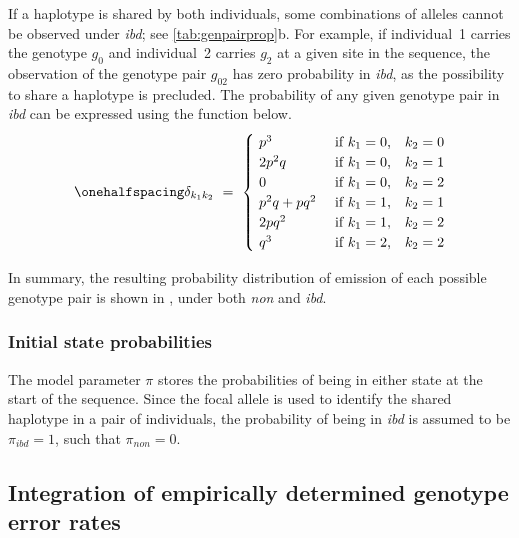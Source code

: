If a haplotype is shared by both individuals, some combinations of alleles cannot be observed under \emph{ibd}; see \cref{tab:genpairprop}{b}.
For example, if individual~1 carries the genotype $g_0$ and individual~2 carries $g_2$ at a given site in the sequence, the observation of the genotype pair $g_{02}$ has zero probability in \emph{ibd}, as the possibility to share a haplotype is precluded.
The probability of any given genotype pair in \emph{ibd} can be expressed using the function below.
\begin{equation}\label{eq:genpairibd}\onehalfspacing
	\delta_{k_1 k_2} ~=~
  \begin{cases}
		~ p^3           & ~ \text{if $k_1 = 0$, ~ $k_2 = 0$} \\
    ~ 2 p^2 q       & ~ \text{if $k_1 = 0$, ~ $k_2 = 1$} \\
    ~ 0             & ~ \text{if $k_1 = 0$, ~ $k_2 = 2$} \\
    ~ p^2 q + p q^2 & ~ \text{if $k_1 = 1$, ~ $k_2 = 1$} \\
    ~ 2 p q^2       & ~ \text{if $k_1 = 1$, ~ $k_2 = 2$} \\
    ~ q^3           & ~ \text{if $k_1 = 2$, ~ $k_2 = 2$}
  \end{cases}
\end{equation}

\null

In summary, the resulting probability distribution of emission of each possible genotype pair is shown in , under both \emph{non} and \emph{ibd}.

%

%





%
\subsubsection{Initial state probabilities}
\label{sec:HmmInit}
%

The model parameter $\pi$ stores the probabilities of being in either state at the start of the sequence.
Since the focal allele is used to identify the shared haplotype in a pair of individuals, the probability of being in \emph{ibd} is assumed to be ${\pi_\textit{ibd} = 1}$, such that ${\pi_\textit{non} = 0}$.


%
\subsection{Integration of empirically determined genotype error rates}
\label{sec:HMMError}
%

